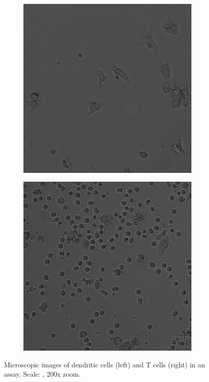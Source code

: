 \documentclass{l4proj}
\begin{document}
\begin{figure}[h]
    \centering
    \begin{subfigure}[h!]{0.3\textwidth}
        \includegraphics[width=\textwidth]{dissertation/figures/example_DCs.png}
    \end{subfigure}
    \begin{subfigure}[h!]{0.3\textwidth}
        \includegraphics[width=\textwidth]{dissertation/figures/example_Tcells.png}
    \end{subfigure}
    \caption{Microscopic images of dendritic cells (left) and T cells (right) in an assay. Scale: , 200x zoom.}
\end{figure}
\end{document}
